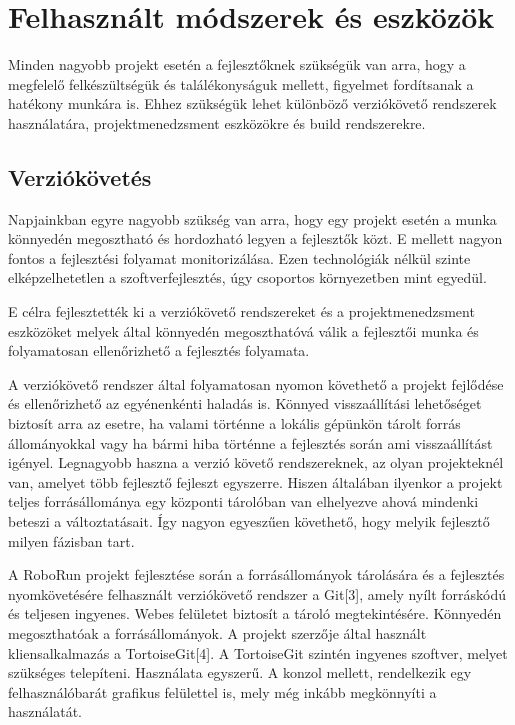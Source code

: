\chapter{Felhasznált módszerek és eszközök}\label{ch:diszkr}

\begin{osszefoglal}
	Minden nagyobb projekt esetén a fejlesztőknek szükségük van arra, hogy a megfelelő felkészültségük és találékonyságuk mellett, figyelmet fordítsanak a hatékony munkára is. Ehhez szükségük lehet különböző verziókövető rendszerek használatára, projektmenedzsment eszközökre és build rendszerekre.
\end{osszefoglal}


\section{Verziókövetés}

Napjainkban egyre nagyobb szükség van arra, hogy egy projekt esetén a munka könnyedén megosztható és hordozható legyen a fejlesztők közt. E mellett nagyon fontos a fejlesztési folyamat monitorizálása. Ezen technológiák nélkül szinte elképzelhetetlen a szoftverfejlesztés, úgy csoportos környezetben mint egyedül.

	E célra fejlesztették  ki a verziókövető rendszereket és a projektmenedzsment eszközöket melyek által könnyedén megoszthatóvá válik a fejlesztői munka és folyamatosan ellenőrizhető a fejlesztés folyamata.  
	
	A verziókövető rendszer által  folyamatosan nyomon követhető a projekt fejlődése és ellenőrizhető az egyénenkénti haladás is. Könnyed visszaállítási lehetőséget biztosít arra az esetre, ha valami történne a lokális gépünkön tárolt forrás állományokkal vagy ha bármi hiba történne a fejlesztés során ami visszaállítást igényel. Legnagyobb haszna a verzió követő rendszereknek, az olyan projekteknél van, amelyet több fejlesztő fejleszt egyszerre. Hiszen általában ilyenkor a projekt teljes forrásállománya egy központi tárolóban van elhelyezve ahová mindenki beteszi a változtatásait. Így nagyon egyeszűen követhető, hogy melyik fejlesztő milyen fázisban tart. 
	
	A RoboRun projekt fejlesztése során a forrásállományok tárolására és a fejlesztés nyomkövetésére felhasznált verziókövető rendszer a Git[3], amely nyílt forráskódú és teljesen ingyenes. Webes felületet biztosít a tároló megtekintésére. Könnyedén megoszthatóak a forrásállományok. A projekt szerzője által használt kliensalkalmazás a  TortoiseGit[4]. A TortoiseGit szintén ingyenes szoftver, melyet szükséges telepíteni. Használata egyszerű. A konzol mellett, rendelkezik egy felhasználóbarát grafikus felülettel is, mely még inkább megkönnyíti a használatát.

